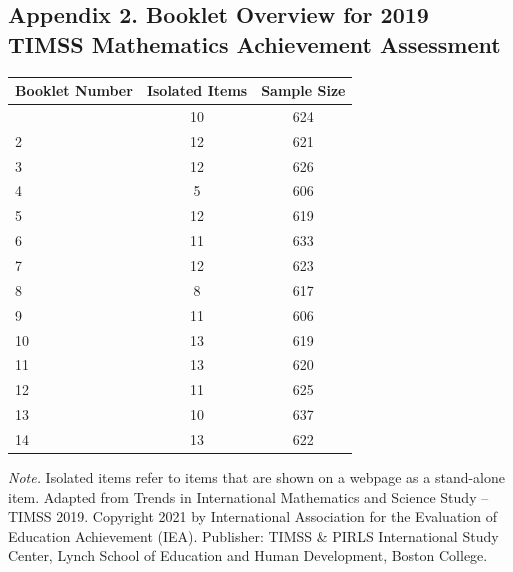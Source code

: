 \documentclass[
  number]{elsarticle}
\begin{document}
\subsection*{Appendix 2. Booklet Overview for 2019 TIMSS Mathematics
Achievement
Assessment}\label{appendix-2.-booklet-overview-for-2019-timss-mathematics-achievement-assessment}

\begin{longtable}[]{@{}lcc@{}}
\toprule\noalign{}
Booklet Number & Isolated Items & Sample Size \\
\midrule\noalign{}
\endhead
\bottomrule\noalign{}
\endlastfoot
1 & 10 & 624 \\
2 & 12 & 621 \\
3 & 12 & 626 \\
4 & 5 & 606 \\
5 & 12 & 619 \\
6 & 11 & 633 \\
7 & 12 & 623 \\
8 & 8 & 617 \\
9 & 11 & 606 \\
10 & 13 & 619 \\
11 & 13 & 620 \\
12 & 11 & 625 \\
13 & 10 & 637 \\
14 & 13 & 622 \\
\end{longtable}

\emph{Note.} Isolated items refer to items that are shown on a webpage
as a stand-alone item. Adapted from Trends in International Mathematics
and Science Study -- TIMSS 2019. Copyright 2021 by International
Association for the Evaluation of Education Achievement (IEA).
Publisher: TIMSS \& PIRLS International Study Center, Lynch School of
Education and Human Development, Boston College.


\nocite{*}
\end{document}
